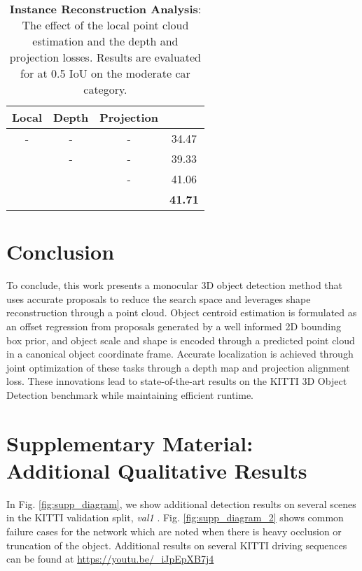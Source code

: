 \documentclass[10pt,twocolumn,letterpaper]{article}
\begin{document}
	\begin{table}[t]
		\small
		\centering
		\begin{tabular}{|c|c|c||c|}
			\hline
			Local      &      Depth & Projection &  \\
			\hline
			-          &          - &          - &     34.47 \\
			\checkmark &          - &          - &     39.33 \\
			\checkmark & \checkmark &          - &     41.06 \\
			\checkmark & \checkmark & \checkmark & \textbf{41.71} \\
			\hline
		\end{tabular}
		\caption{\textbf{Instance Reconstruction Analysis}: The effect of the local point cloud estimation and the depth and projection losses. Results are evaluated for  at 0.5 IoU on the moderate car category.}
		\label{tab:local_global}
	\end{table}
	
	\section{Conclusion}
	To conclude, this work presents a monocular 3D object detection method that uses accurate proposals to reduce the search space and leverages shape reconstruction through a point cloud. Object centroid estimation is formulated as an offset regression from proposals generated by a well informed 2D bounding box prior, and object scale and shape is encoded through a predicted point cloud in a canonical object coordinate frame. Accurate localization is achieved through joint optimization of these tasks through a depth map and projection alignment loss. These innovations lead to state-of-the-art results on the KITTI 3D Object Detection benchmark while maintaining efficient runtime.
	
	{\small
		
		
	}
	
	\clearpage

    \appendix
    \onecolumn
    
    \section*{Supplementary Material: Additional Qualitative Results}
	In Fig. \ref{fig:supp_diagram}, we show additional detection results on several scenes in the KITTI \cite{geiger_kitti} validation split, \textit{val1} \cite{chen_mv3d}. Fig. \ref{fig:supp_diagram_2} shows common failure cases for the network which are noted when there is heavy occlusion or truncation of the object. Additional results on several KITTI driving sequences can be found at \href{https://youtu.be/_iJpEpXB7j4}{https://youtu.be/\_iJpEpXB7j4}
	
\end{document}
